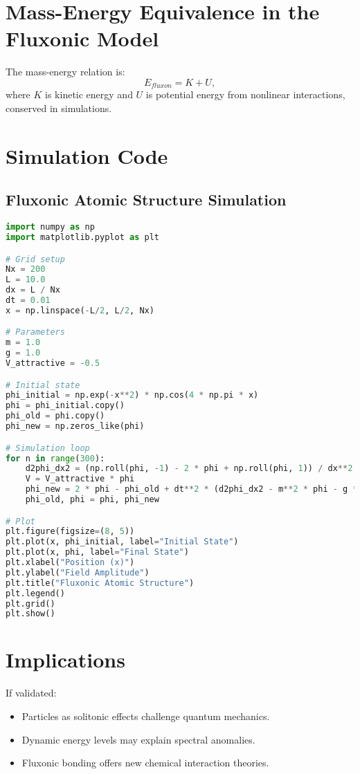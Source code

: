 \documentclass{article}
\begin{document}
\section{Mass-Energy Equivalence in the Fluxonic Model}
The mass-energy relation is:
\begin{equation}
E_{fluxon} = K + U,
\end{equation}
where \(K\) is kinetic energy and \(U\) is potential energy from nonlinear interactions, conserved in simulations.

\section{Simulation Code}
\subsection{Fluxonic Atomic Structure Simulation}
\begin{lstlisting}[language=Python, caption=Fluxonic Atomic Structure Simulation, label=lst:atomic]
import numpy as np
import matplotlib.pyplot as plt

# Grid setup
Nx = 200
L = 10.0
dx = L / Nx
dt = 0.01
x = np.linspace(-L/2, L/2, Nx)

# Parameters
m = 1.0
g = 1.0
V_attractive = -0.5

# Initial state
phi_initial = np.exp(-x**2) * np.cos(4 * np.pi * x)
phi = phi_initial.copy()
phi_old = phi.copy()
phi_new = np.zeros_like(phi)

# Simulation loop
for n in range(300):
    d2phi_dx2 = (np.roll(phi, -1) - 2 * phi + np.roll(phi, 1)) / dx**2  # Periodic boundaries
    V = V_attractive * phi
    phi_new = 2 * phi - phi_old + dt**2 * (d2phi_dx2 - m**2 * phi - g * phi**3 + V)
    phi_old, phi = phi, phi_new

# Plot
plt.figure(figsize=(8, 5))
plt.plot(x, phi_initial, label="Initial State")
plt.plot(x, phi, label="Final State")
plt.xlabel("Position (x)")
plt.ylabel("Field Amplitude")
plt.title("Fluxonic Atomic Structure")
plt.legend()
plt.grid()
plt.show()
\end{lstlisting}

\section{Implications}
If validated:
\begin{itemize}
    \item Particles as solitonic effects challenge quantum mechanics.
    \item Dynamic energy levels may explain spectral anomalies.
    \item Fluxonic bonding offers new chemical interaction theories.
\end{itemize}
\end{document}
